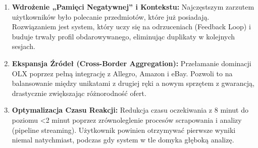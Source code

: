 \documentclass[polish,edition=2025]{zpiday}
\begin{document}
\begin{enumerate}
    \item \textbf{Wdrożenie „Pamięci Negatywnej” i Kontekstu:} Najczęstszym zarzutem użytkowników było polecanie przedmiotów, które już posiadają. Rozwiązaniem jest system, który uczy się na odrzuceniach (Feedback Loop) i buduje trwały profil obdarowywanego, eliminując duplikaty w kolejnych sesjach.
    \item \textbf{Ekspansja Źródeł (Cross-Border Aggregation):} Przełamanie dominacji OLX poprzez pełną integrację z Allegro, Amazon i eBay. Pozwoli to na balansowanie między unikatami z drugiej ręki a nowym sprzętem z gwarancją, drastycznie zwiększając różnorodność ofert.
    \item \textbf{Optymalizacja Czasu Reakcji:} Redukcja czasu oczekiwania z 8 minut do poziomu <2 minut poprzez zrównoleglenie procesów scrapowania i analizy (pipeline streaming). Użytkownik powinien otrzymywać pierwsze wyniki niemal natychmiast, podczas gdy system w tle domyka głęboką analizę.
\end{enumerate}




\end{document}
